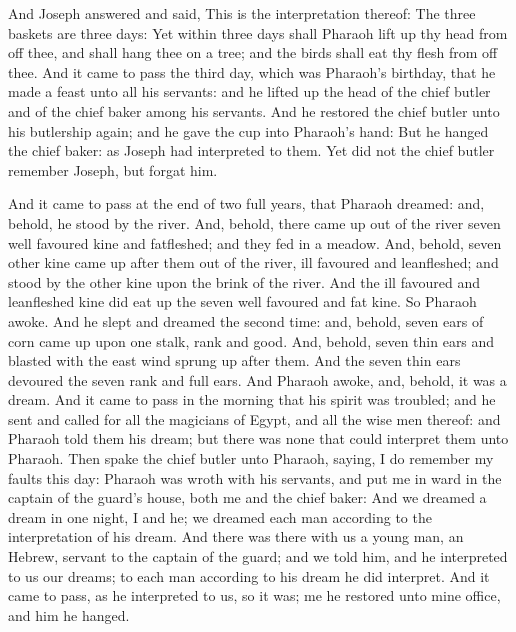 \begin{biblechapter}
\verse And Joseph answered and said, This is the interpretation thereof: The three baskets are three days:
\verse Yet within three days shall Pharaoh lift up thy head from off thee, and shall hang thee on a tree; and the birds shall eat thy flesh from off thee.
\verse And it came to pass the third day, which was Pharaoh's birthday, that he made a feast unto all his servants: and he lifted up the head of the chief butler and of the chief baker among his servants.
\verse And he restored the chief butler unto his butlership again; and he gave the cup into Pharaoh's hand:
\verse But he hanged the chief baker: as Joseph had interpreted to them.
\verse Yet did not the chief butler remember Joseph, but forgat him.
\end{biblechapter}

\begin{biblechapter} %
 And it came to pass at the end of two full years, that Pharaoh dreamed: and, behold, he stood by the river.
\verse And, behold, there came up out of the river seven well favoured kine and fatfleshed; and they fed in a meadow.
\verse And, behold, seven other kine came up after them out of the river, ill favoured and leanfleshed; and stood by the other kine upon the brink of the river.
\verse And the ill favoured and leanfleshed kine did eat up the seven well favoured and fat kine. So Pharaoh awoke.
\verse And he slept and dreamed the second time: and, behold, seven ears of corn came up upon one stalk, rank and good.
\verse And, behold, seven thin ears and blasted with the east wind sprung up after them.
\verse And the seven thin ears devoured the seven rank and full ears. And Pharaoh awoke, and, behold, it was a dream.
\verse And it came to pass in the morning that his spirit was troubled; and he sent and called for all the magicians of Egypt, and all the wise men thereof: and Pharaoh told them his dream; but there was none that could interpret them unto Pharaoh.
\verse Then spake the chief butler unto Pharaoh, saying, I do remember my faults this day:
\verse Pharaoh was wroth with his servants, and put me in ward in the captain of the guard's house, both me and the chief baker:
\verse And we dreamed a dream in one night, I and he; we dreamed each man according to the interpretation of his dream.
\verse And there was there with us a young man, an Hebrew, servant to the captain of the guard; and we told him, and he interpreted to us our dreams; to each man according to his dream he did interpret.
\verse And it came to pass, as he interpreted to us, so it was; me he restored unto mine office, and him he hanged.

\end{biblechapter}
